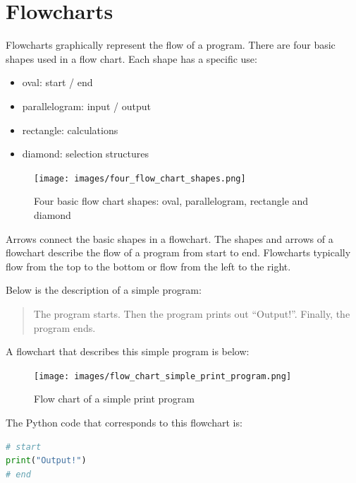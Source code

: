 \documentclass{book}
\providecommand{\tightlist}{%
      \setlength{\itemsep}{0pt}\setlength{\parskip}{0pt}}
\begin{document}
    
        \section{Flowcharts}\label{flowcharts}
    




    
        Flowcharts graphically represent the flow of a program. There are four
basic shapes used in a flow chart. Each shape has a specific use:

\begin{itemize}
\tightlist
\item
  oval: start / end
\item
  parallelogram: input / output
\item
  rectangle: calculations
\item
  diamond: selection structures
\end{itemize}

\begin{figure}
\centering
\texttt{[image: images/four\_flow\_chart\_shapes.png]}
\caption{Four basic flow chart shapes: oval, parallelogram, rectangle
and diamond}
\end{figure}

Arrows connect the basic shapes in a flowchart. The shapes and arrows of
a flowchart describe the flow of a program from start to end. Flowcharts
typically flow from the top to the bottom or flow from the left to the
right.
    




    
        Below is the description of a simple program:

\begin{quote}
The program starts. Then the program prints out ``Output!''. Finally,
the program ends.
\end{quote}

A flowchart that describes this simple program is below:

\begin{figure}
\centering
\texttt{[image: images/flow\_chart\_simple\_print\_program.png]}
\caption{Flow chart of a simple print program}
\end{figure}

The Python code that corresponds to this flowchart is:

\begin{lstlisting}[language=Python]
# start
print("Output!")
# end
\end{lstlisting}
    
\end{document}
